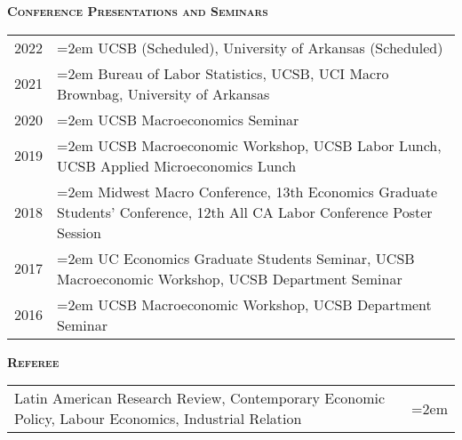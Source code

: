 \documentclass[11pt]{article}
\newenvironment{rSection}[1]{ %
  {\large\bf\textsc{#1}}
  \vspace{0.15cm}
  \begin{list}{}{ %
    \setlength{\leftmargin}{1.5em} %
    \setlength{\rightmargin}{1.5em}
  }
  \item[]
}{
  \end{list}
  \vspace{0.15cm}
}
\begin{document}
\begin{rSection}{Conference Presentations and Seminars}
\begin{tabularx}{\linewidth}{l >{\hangindent=2em}X}
2022 & UCSB (Scheduled), University of Arkansas (Scheduled)\\
2021 & Bureau of Labor Statistics, UCSB, UCI Macro Brownbag, University of Arkansas \\
2020 & UCSB Macroeconomics Seminar\\
2019 & UCSB Macroeconomic Workshop, UCSB Labor Lunch, UCSB Applied Microeconomics Lunch\\
2018 & Midwest Macro Conference, 13th Economics Graduate Students' Conference, 12th All CA Labor Conference Poster Session\\
2017 & UC Economics Graduate Students Seminar, UCSB Macroeconomic Workshop, UCSB Department Seminar\\
2016 & UCSB Macroeconomic Workshop, UCSB Department Seminar\\
\end{tabularx}
\end{rSection}

\begin{rSection}{Referee}
\begin{tabularx}{\linewidth}{l >{\hangindent=2em}X}
Latin American Research Review, Contemporary Economic Policy, Labour Economics, Industrial Relation
\end{tabularx}
\end{rSection}
\end{document}
